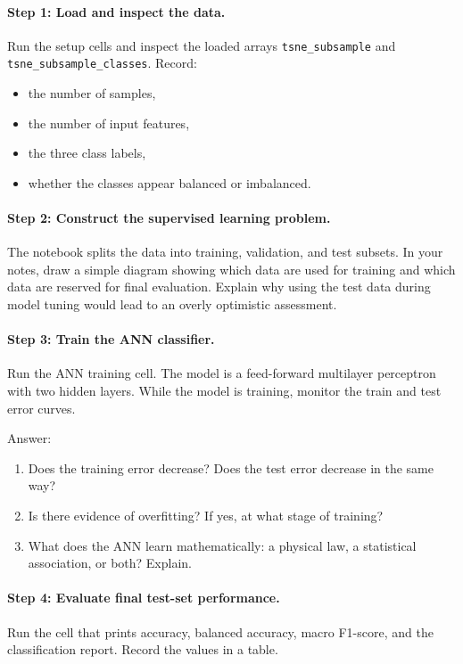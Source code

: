 \documentclass[11pt]{article}
\begin{document}
\paragraph{Step 1: Load and inspect the data.}
Run the setup cells and inspect the loaded arrays \texttt{tsne\_subsample} and \texttt{tsne\_subsample\_classes}. Record:
\begin{itemize}
    \item the number of samples,
    \item the number of input features,
    \item the three class labels,
    \item whether the classes appear balanced or imbalanced.
\end{itemize}

\paragraph{Step 2: Construct the supervised learning problem.}
The notebook splits the data into training, validation, and test subsets. In your notes, draw a simple diagram showing which data are used for training and which data are reserved for final evaluation. Explain why using the test data during model tuning would lead to an overly optimistic assessment.

\paragraph{Step 3: Train the ANN classifier.}
Run the ANN training cell. The model is a feed-forward multilayer perceptron with two hidden layers. While the model is training, monitor the train and test error curves.

Answer:
\begin{enumerate}
    \item Does the training error decrease? Does the test error decrease in the same way?
    \item Is there evidence of overfitting? If yes, at what stage of training?
    \item What does the ANN learn mathematically: a physical law, a statistical association, or both? Explain.
\end{enumerate}

\paragraph{Step 4: Evaluate final test-set performance.}
Run the cell that prints accuracy, balanced accuracy, macro F1-score, and the classification report. Record the values in a table.
\end{document}
